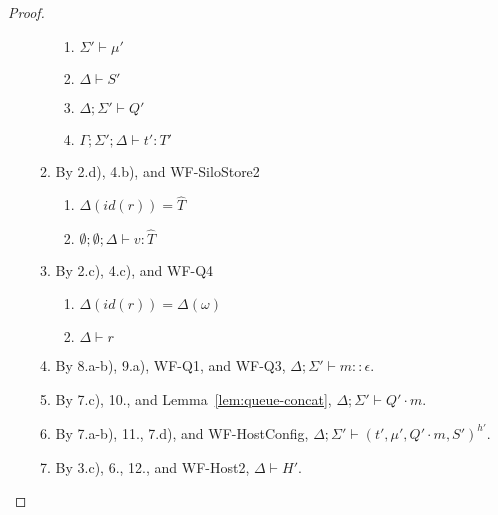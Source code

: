 \documentclass{article}
\theoremstyle{definition}
\begin{document}
\begin{proof}
\begin{itemize}
\begin{enumerate}
\begin{enumerate}[label=(\alph*)]
  \item $\Sigma' \vdash \mu'$
  \item $\Delta \vdash S'$
  \item $\Delta ; \Sigma' \vdash Q'$
  \item $\Gamma ; \Sigma' ; \Delta \vdash t' : T'$
  \end{enumerate}
\item By 2.d), 4.b), and WF-SiloStore2
  \begin{enumerate}[label=(\alph*)]
  \item $\Delta(id(r)) = \hat{T}$
  \item $\emptyset ; \emptyset ; \Delta \vdash v : \hat{T}$
  \end{enumerate}
\item By 2.c), 4.c), and WF-Q4
  \begin{enumerate}[label=(\alph*)]
  \item $\Delta(id(r)) = \Delta(\omega)$
  \item $\Delta \vdash r$
  \end{enumerate}
\item By 8.a-b), 9.a), WF-Q1, and WF-Q3, $\Delta ; \Sigma' \vdash m :: \epsilon$.
\item By 7.c), 10., and Lemma~\ref{lem:queue-concat}, $\Delta ; \Sigma' \vdash Q' \cdot m$.
\item By 7.a-b), 11., 7.d), and WF-HostConfig, $\Delta ; \Sigma' \vdash (t', \mu', Q' \cdot m, S')^{h'}$.
\item By 3.c), 6., 12., and WF-Host2, $\Delta \vdash H'$.
\end{enumerate}


\end{itemize}
\end{proof}
\end{document}
